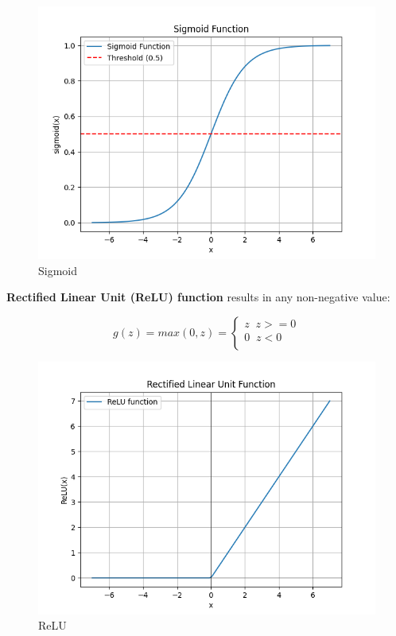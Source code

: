 \documentclass[12pt]{report}
\begin{document}
\begin{figure}[H]
  \centering
  \includegraphics[trim =0.0cm 0.0cm 0.0cm 0.0cm, clip, scale=0.5]{pics/sigmoid.png}
  \caption{Sigmoid}
\end{figure}

\textbf{Rectified Linear Unit (ReLU) function} results in any non-negative value:

\begin{equation}
  g(z) = max (0,z) =
\begin{cases}
  z \;\; z >= 0  \\
  0 \;\; z < 0 \\
\end{cases}
\end{equation}

\begin{figure}[H]
  \centering
  \includegraphics[trim =0.0cm 0.0cm 0.0cm 0.0cm, clip, scale=0.5]{pics/ReLU.png}
  \caption{ReLU}
\end{figure}
\end{document}
